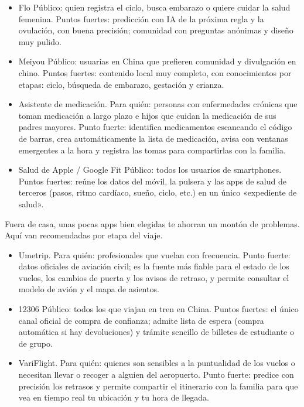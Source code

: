 
\begin{itemize}
  \item Flo Público: quien registra el ciclo, busca embarazo o quiere cuidar la salud femenina. Puntos fuertes: predicción con IA de la próxima regla y la ovulación, con buena precisión; comunidad con preguntas anónimas y diseño muy pulido.
  \item Meiyou Público: usuarias en China que prefieren comunidad y divulgación en chino. Puntos fuertes: contenido local muy completo, con conocimientos por etapas: ciclo, búsqueda de embarazo, gestación y crianza.
\end{itemize}


\begin{itemize}
  \item Asistente de medicación. Para quién: personas con enfermedades crónicas que toman medicación a largo plazo e hijos que cuidan la medicación de sus padres mayores. Punto fuerte: identifica medicamentos escaneando el código de barras, crea automáticamente la lista de medicación, avisa con ventanas emergentes a la hora y registra las tomas para compartirlas con la familia.
\end{itemize}


\begin{itemize}
  \item Salud de Apple / Google Fit Público: todos los usuarios de smartphones. Puntos fuertes: reúne los datos del móvil, la pulsera y las apps de salud de terceros (pasos, ritmo cardíaco, sueño, ciclo, etc.) en un único «expediente de salud».
\end{itemize}


Fuera de casa, unas pocas apps bien elegidas te ahorran un montón de problemas. Aquí van recomendadas por etapa del viaje.


\begin{itemize}
  \item Umetrip. Para quién: profesionales que vuelan con frecuencia. Punto fuerte: datos oficiales de aviación civil; es la fuente más fiable para el estado de los vuelos, los cambios de puerta y los avisos de retraso, y permite consultar el modelo de avión y el mapa de asientos.
  \item 12306 Público: todos los que viajan en tren en China. Puntos fuertes: el único canal oficial de compra de confianza; admite lista de espera (compra automática si hay devoluciones) y trámite sencillo de billetes de estudiante o de grupo.
  \item VariFlight. Para quién: quienes son sensibles a la puntualidad de los vuelos o necesitan llevar o recoger a alguien del aeropuerto. Punto fuerte: predice con precisión los retrasos y permite compartir el itinerario con la familia para que vea en tiempo real tu ubicación y tu hora de llegada.
\end{itemize}

